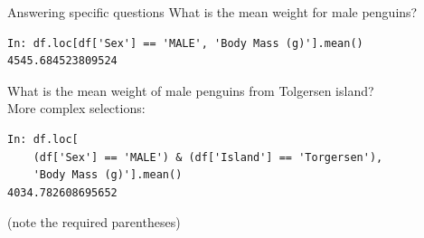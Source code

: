 \documentclass[aspectratio=169,usenames,dvipsnames]{beamer}
\begin{document}
\begin{frame}[fragile]{Answering specific questions}
What is the mean weight for male penguins?
\begin{lstlisting}
In: df.loc[df['Sex'] == 'MALE', 'Body Mass (g)'].mean()
4545.684523809524
\end{lstlisting}

\pause
What is the mean weight of male penguins from Tolgersen island? \\
More complex selections:
\begin{lstlisting}
In: df.loc[
    (df['Sex'] == 'MALE') & (df['Island'] == 'Torgersen'),
    'Body Mass (g)'].mean()
4034.782608695652
\end{lstlisting}
(note the required parentheses)
\end{frame}




% 
% 
% 
 
\end{document}
